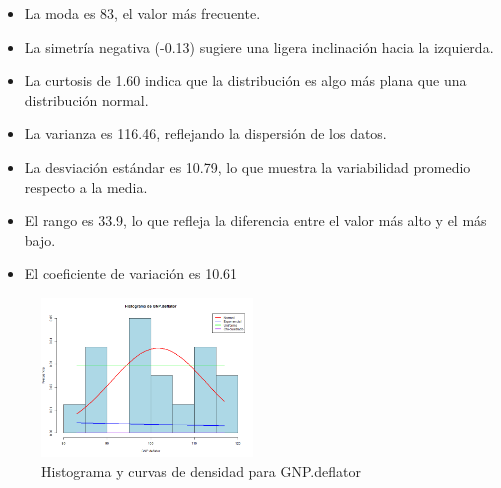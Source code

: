 \documentclass{article}
\begin{document}
\begin{itemize}
\begin{itemize}
\begin{itemize}
                \item La moda es 83, el valor más frecuente.
                \item La simetría negativa (-0.13) sugiere una ligera inclinación hacia la izquierda.
                \item La curtosis de 1.60 indica que la distribución es algo más plana que una distribución normal.
                \item La varianza es 116.46, reflejando la dispersión de los datos.
                \item La desviación estándar es 10.79, lo que muestra la variabilidad promedio respecto a la media.
                \item El rango es 33.9, lo que refleja la diferencia entre el valor más alto y el más bajo.
                \item El coeficiente de variación es 10.61%
            \end{itemize}
    \end{itemize}

    \begin{figure}[H]
        \centering
        \includegraphics[width=0.5\textwidth]{HistogramasDensidad/histograma_GNP.deflator.png}
        \caption{Histograma y curvas de densidad para GNP.deflator}
        \vspace{0.5cm}
    \end{figure}
    

\end{itemize}
\end{document}
